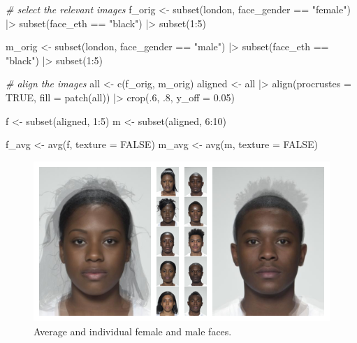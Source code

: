 \documentclass[
  man,floatsintext]{apa6}
\newenvironment{Shaded}{\begin{snugshade}}{\end{snugshade}}
\newcommand{\AttributeTok}[1]{\textcolor[rgb]{0.77,0.63,0.00}{#1}}
\newcommand{\CommentTok}[1]{\textcolor[rgb]{0.56,0.35,0.01}{\textit{#1}}}
\newcommand{\ConstantTok}[1]{\textcolor[rgb]{0.00,0.00,0.00}{#1}}
\newcommand{\DecValTok}[1]{\textcolor[rgb]{0.00,0.00,0.81}{#1}}
\newcommand{\FloatTok}[1]{\textcolor[rgb]{0.00,0.00,0.81}{#1}}
\newcommand{\FunctionTok}[1]{\textcolor[rgb]{0.00,0.00,0.00}{#1}}
\newcommand{\NormalTok}[1]{#1}
\newcommand{\OtherTok}[1]{\textcolor[rgb]{0.56,0.35,0.01}{#1}}
\newcommand{\SpecialCharTok}[1]{\textcolor[rgb]{0.00,0.00,0.00}{#1}}
\newcommand{\StringTok}[1]{\textcolor[rgb]{0.31,0.60,0.02}{#1}}
\begin{document}
\begin{Shaded}
\begin{Highlighting}[]
\CommentTok{\# select the relevant images}
\NormalTok{f\_orig }\OtherTok{\textless{}{-}} \FunctionTok{subset}\NormalTok{(london, face\_gender }\SpecialCharTok{==} \StringTok{"female"}\NormalTok{) }\SpecialCharTok{|\textgreater{}} 
  \FunctionTok{subset}\NormalTok{(face\_eth }\SpecialCharTok{==} \StringTok{"black"}\NormalTok{) }\SpecialCharTok{|\textgreater{}} \FunctionTok{subset}\NormalTok{(}\DecValTok{1}\SpecialCharTok{:}\DecValTok{5}\NormalTok{)}

\NormalTok{m\_orig }\OtherTok{\textless{}{-}} \FunctionTok{subset}\NormalTok{(london, face\_gender }\SpecialCharTok{==} \StringTok{"male"}\NormalTok{) }\SpecialCharTok{|\textgreater{}} 
  \FunctionTok{subset}\NormalTok{(face\_eth }\SpecialCharTok{==} \StringTok{"black"}\NormalTok{) }\SpecialCharTok{|\textgreater{}} \FunctionTok{subset}\NormalTok{(}\DecValTok{1}\SpecialCharTok{:}\DecValTok{5}\NormalTok{)}

\CommentTok{\# align the images}
\NormalTok{all }\OtherTok{\textless{}{-}} \FunctionTok{c}\NormalTok{(f\_orig, m\_orig) }
\NormalTok{aligned }\OtherTok{\textless{}{-}}\NormalTok{ all }\SpecialCharTok{|\textgreater{}}
  \FunctionTok{align}\NormalTok{(}\AttributeTok{procrustes =} \ConstantTok{TRUE}\NormalTok{, }\AttributeTok{fill =} \FunctionTok{patch}\NormalTok{(all)) }\SpecialCharTok{|\textgreater{}}
  \FunctionTok{crop}\NormalTok{(.}\DecValTok{6}\NormalTok{, .}\DecValTok{8}\NormalTok{, }\AttributeTok{y\_off =} \FloatTok{0.05}\NormalTok{)}

\NormalTok{f }\OtherTok{\textless{}{-}} \FunctionTok{subset}\NormalTok{(aligned, }\DecValTok{1}\SpecialCharTok{:}\DecValTok{5}\NormalTok{)}
\NormalTok{m }\OtherTok{\textless{}{-}} \FunctionTok{subset}\NormalTok{(aligned, }\DecValTok{6}\SpecialCharTok{:}\DecValTok{10}\NormalTok{)}

\NormalTok{f\_avg }\OtherTok{\textless{}{-}} \FunctionTok{avg}\NormalTok{(f, }\AttributeTok{texture =} \ConstantTok{FALSE}\NormalTok{)}
\NormalTok{m\_avg }\OtherTok{\textless{}{-}} \FunctionTok{avg}\NormalTok{(m, }\AttributeTok{texture =} \ConstantTok{FALSE}\NormalTok{)}
\end{Highlighting}
\end{Shaded}

\begin{figure}
\includegraphics[width=1\linewidth]{index_files/figure-latex/sexdim-avg-1} \caption{Average and individual female and male faces.}\label{fig:sexdim-avg}
\end{figure}
\end{document}
